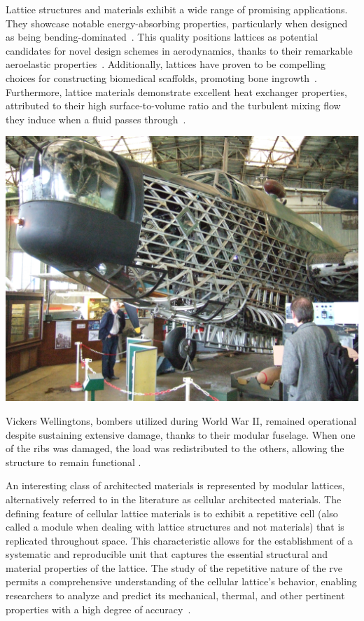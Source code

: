 Lattice structures and materials exhibit a wide range of promising applications. They showcase notable energy-absorbing properties, particularly when designed as being bending-dominated~. This quality positions lattices as potential candidates for novel design schemes in aerodynamics, thanks to their remarkable aeroelastic properties~. Additionally, lattices have proven to be compelling choices for constructing biomedical scaffolds, promoting bone ingrowth~. Furthermore, lattice materials demonstrate excellent heat exchanger properties, attributed to their high surface-to-volume ratio and the turbulent mixing flow they induce when a fluid passes through~.
\begin{marginfigure}
        \includegraphics[width=\linewidth]{figures/02_literature/wellington.jpg}
        \caption{Vickers Wellingtons, bombers utilized during World War II, remained operational despite sustaining extensive damage, thanks to their modular fuselage. When one of the ribs was damaged, the load was redistributed to the others, allowing the structure to remain functional \cite{airshowconsultants_real_2013}.}
        \label{fig:vick}
\end{marginfigure}

An interesting class of architected materials is represented by modular lattices, alternatively referred to in the literature as cellular architected materials. The defining feature of cellular lattice materials is to exhibit a repetitive cell (also called a module when dealing with lattice structures and not materials) that is replicated throughout space. This characteristic allows for the establishment of a systematic and reproducible unit that captures the essential structural and material properties of the lattice. The study of the repetitive nature of the \gls{rve} permits a comprehensive understanding of the cellular lattice's behavior, enabling researchers to analyze and predict its mechanical, thermal, and other pertinent properties with a high degree of accuracy~. 

